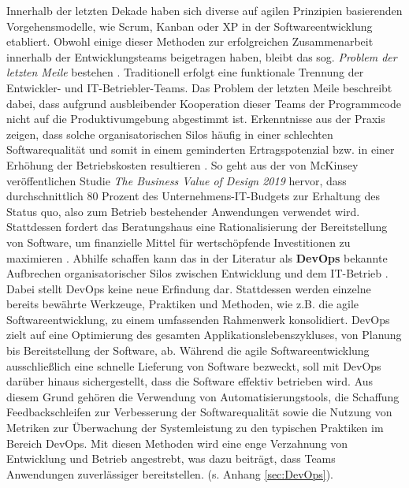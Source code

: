 Innerhalb der letzten Dekade haben sich diverse auf agilen Prinzipien basierenden Vorgehensmodelle, wie Scrum, Kanban oder \ac{XP} in der Softwareentwicklung etabliert. Obwohl einige dieser Methoden zur erfolgreichen Zusammenarbeit innerhalb der Entwicklungsteams beigetragen haben, bleibt das sog.  \textit{Problem der letzten Meile} bestehen \cite{Qentelli.20230305}. Traditionell erfolgt eine funktionale Trennung der Entwickler- und IT-Betriebler-Teams. Das Problem der letzten Meile beschreibt dabei, dass aufgrund ausbleibender Kooperation dieser Teams der Programmcode nicht auf die Produktivumgebung abgestimmt ist. Erkenntnisse aus der Praxis zeigen, dass solche organisatorischen Silos häufig in einer schlechten Softwarequalität und somit in einem geminderten Ertragspotenzial bzw. in einer Erhöhung der Betriebskosten resultieren \cite[1]{Halstenberg.2020}. So geht aus der von McKinsey veröffentlichen Studie \textit{The Business Value of Design 2019} hervor, dass durchschnittlich 80 Prozent des Unternehmens-IT-Budgets zur Erhaltung des Status quo, also zum Betrieb bestehender Anwendungen verwendet wird. Stattdessen fordert das Beratungshaus eine Rationalisierung der Bereitstellung von Software, um finanzielle Mittel für wertschöpfende Investitionen zu maximieren \cite{.20230305}. Abhilfe schaffen kann das in der Literatur als \textbf{\ac{DevOps}} bekannte Aufbrechen organisatorischer Silos zwischen Entwicklung und dem IT-Betrieb \cite[1]{Halstenberg.2020}. 
Dabei stellt DevOps keine neue Erfindung dar. Stattdessen werden einzelne bereits bewährte Werkzeuge, Praktiken und Methoden, wie z.B. die agile Softwareentwicklung, zu einem umfassenden Rahmenwerk konsolidiert. DevOps zielt auf eine Optimierung des gesamten Applikationslebenszykluses, von Planung bis Bereitstellung der Software, ab. Während die agile Softwareentwicklung ausschließlich eine schnelle Lieferung von Software bezweckt, soll mit DevOps darüber hinaus sichergestellt, dass die Software effektiv betrieben wird. Aus diesem Grund gehören die Verwendung von Automatisierungstools, die Schaffung Feedbackschleifen zur Verbesserung der Softwarequalität sowie die Nutzung von Metriken zur Überwachung der Systemleistung zu den typischen Praktiken im Bereich DevOps. Mit diesen Methoden wird eine enge Verzahnung von Entwicklung und Betrieb angestrebt, was dazu beiträgt, dass Teams Anwendungen zuverlässiger bereitstellen. (s. Anhang \ref{sec:DevOps}). 
